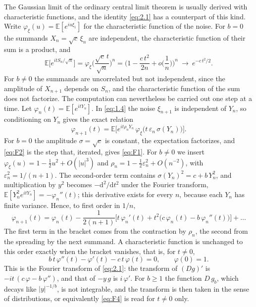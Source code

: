 \documentclass[aip,jmp,preprint,onecolumn,floatfix,superscriptaddress,nofootinbib,11pt]{revtex4-2}
\theoremstyle{plain}
\theoremstyle{remark}
\numberwithin{equation}{section}
\newcommand{\dd}{\mathrm{d}}
\newcommand{\E}{\mathbb{E}}
\newcommand{\eps}{\varepsilon}
\begin{document}
The Gaussian limit of the ordinary central limit theorem is usually derived with characteristic functions, and the identity \eqref{eq:2.1} has a counterpart of this kind. Write $\varphi_\xi(u)=\E[e^{iu\xi_1}]$ for the characteristic function of the noise. For $b=0$ the summands $X_n=\sqrt c\,\xi_n$ are independent, the characteristic function of their sum is a product, and
\begin{equation}
\E\big[e^{itS_n/\sqrt n}\big]=\varphi_\xi\Big(\frac{\sqrt c\,t}{\sqrt n}\Big)^{n}=\Big(1-\frac{c\,t^{2}}{2n}+o\Big(\frac1n\Big)\Big)^{n}\ \longrightarrow\ e^{-c\,t^{2}/2}.
\label{eq:F1}
\end{equation}
For $b\ne0$ the summands are uncorrelated but not independent, since the amplitude of $X_{n+1}$ depends on $S_n$, and the characteristic function of the sum does not factorize. The computation can nevertheless be carried out one step at a time. Let $\varphi_n(t)=\E[e^{itY_n}]$. In \eqref{eq:1.4} the noise $\xi_{n+1}$ is independent of $Y_n$, so conditioning on $Y_n$ gives the exact relation
\begin{equation}
\varphi_{n+1}(t)=\E\Big[e^{it\rho_nY_n}\,\varphi_\xi\big(t\,\eps_n\,\sigma(Y_n)\big)\Big].
\label{eq:F2}
\end{equation}
For $b=0$ the amplitude $\sigma=\sqrt c$ is constant, the expectation factorizes, and \eqref{eq:F2} is the step that, iterated, gives \eqref{eq:F1}. For $b\ne0$ we insert $\varphi_\xi(u)=1-\tfrac12u^{2}+O(|u|^{3})$ and $\rho_n=1-\tfrac12\eps_n^{2}+O(n^{-2})$, with $\eps_n^{2}=1/(n+1)$. The second-order term contains $\sigma(Y_n)^{2}=c+b\,Y_n^{2}$, and multiplication by $y^{2}$ becomes $-\dd^{2}/\dd t^{2}$ under the Fourier transform, $\E[Y_n^{2}e^{itY_n}]=-\varphi_n''(t)$; this derivative exists for every $n$, because each $Y_n$ has finite variance. Hence, to first order in $1/n$,
\begin{equation}
\varphi_{n+1}(t)=\varphi_n(t)-\frac{1}{2(n+1)}\Big[t\,\varphi_n'(t)+t^{2}\big(c\,\varphi_n(t)-b\,\varphi_n''(t)\big)\Big]+\dots
\label{eq:F3}
\end{equation}
The first term in the bracket comes from the contraction by $\rho_n$, the second from the spreading by the next summand. A characteristic function is unchanged to this order exactly when the bracket vanishes, that is, for $t\ne0$,
\begin{equation}
b\,t\,\varphi''(t)-\varphi'(t)-c\,t\,\varphi(t)=0,\qquad \varphi(0)=1 .
\label{eq:F4}
\end{equation}
This is the Fourier transform of \eqref{eq:2.1}: the transform of $(Dg)'$ is $-it\,(c\,\varphi-b\,\varphi'')$, and that of $-y\,g$ is $i\,\varphi'$. For $b\ge1$ the function $D\,g_b$, which decays like $|y|^{-1/b}$, is not integrable, and the transform is then taken in the sense of distributions, or equivalently \eqref{eq:F4} is read for $t\ne0$ only.
 
\end{document}
